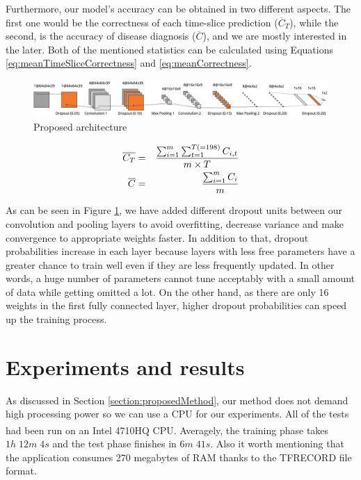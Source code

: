 \documentclass[a4paper,fleqn]{cas-dc}
\begin{document}
Furthermore, our model's accuracy can be obtained in two different aspects. The first one would be the correctness of each time-slice prediction ($\overline{C}_{T}$), while the second, is the accuracy of disease diagnosis ($\overline{C}$), and we are mostly interested in the later. Both of the mentioned statistics can be calculated using Equations \eqref{eq:meanTimeSliceCorrectness} and \eqref{eq:meanCorrectness}.


\begin{figure}
	\includegraphics[width=\linewidth]{images/cnnArchHorizontal}
	\caption{Proposed architecture}
	\label{fig:cnnHorizontalArch}
\end{figure}

\begin{eqnarray}
\label{eq:meanTimeSliceCorrectness}
\overline{C_{T}} &=& {{\sum_{i=1}^{m} \sum_{t=1}^{T (=198)} C_{i,t} } \over {m \times T} } \\ 
\label{eq:meanCorrectness}
\overline{C} &=& {{\sum_{i=1}^{m} C_i } \over {m } } 
\end{eqnarray}



As can be seen in Figure \ref{fig:cnnHorizontalArch}, we have added different dropout units between our convolution and pooling layers to avoid overfitting, decrease variance and make convergence to appropriate weights faster. In addition to that, dropout probabilities increase in each layer because layers with less free parameters have a greater chance to train well even if they are less frequently updated. In other words, a huge number of parameters cannot tune acceptably with a small amount of data while getting omitted a lot. On the other hand, as there are only 16 weights in the first fully connected layer, higher dropout probabilities can speed up the training process.






\section{Experiments and results}
\label{section:results}
As discussed in Section \ref{section:proposedMethod}, our method does not demand high processing power so we can use a CPU for our experiments. All of the tests had been run on an Intel\textsuperscript{\tiny\textregistered} 4710HQ CPU. Averagely, the training phase takes $1h \; 12m \; 4s$ and the test phase finishes in $6m \; 41s$. Also it worth mentioning that the application consumes 270 megabytes of RAM thanks to the TFRECORD file format.
\end{document}
